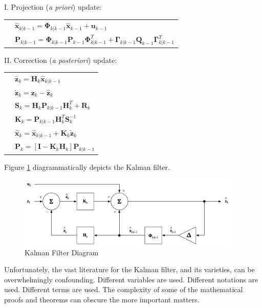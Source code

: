 I. Projection (\textit{a priori}) update:

\begingroup
\renewcommand{\arraystretch}{1.25}
\begin{tabular}{l l}
\phantom{.} & $\hat{\mathbf{x}}_{k|k-1} = \mathbf{\Phi}_{k|k-1} \hat{\mathbf{x}}_{k-1} + \mathbf{u}_{k-1}$ \\
\phantom{.} & $\mathbf{P}_{k|k-1} = \mathbf{\Phi}_{k|k-1} \mathbf{P}_{k-1} \mathbf{\Phi}_{k|k-1}^T + \mathbf{\Gamma}_{k|k-1} \mathbf{Q}_{k-1} \mathbf{\Gamma}_{k|k-1}^T$
\end{tabular}
\endgroup

II. Correction (\textit{a posteriori}) update:

\begingroup
\renewcommand{\arraystretch}{1.25}
\begin{tabular}{l l}
\phantom{.} & $\hat{\mathbf{z}}_k = \mathbf{H}_k \hat{\mathbf{x}}_{k|k-1}$ \\
\phantom{.} & $\tilde{\mathbf{z}}_k = \mathbf{z}_k - \hat{\mathbf{z}}_k$ \\
\phantom{.} & $\mathbf{S}_k = \mathbf{H}_k \mathbf{P}_{k|k-1} \mathbf{H}_k^T + \mathbf{R}_k$ \\
\phantom{.} & $\mathbf{K}_k = \mathbf{P}_{k|k-1} \mathbf{H}_{k}^T \mathbf{S}_k^{-1}$ \\
\phantom{.} & $\hat{\mathbf{x}}_k = \hat{\mathbf{x}}_{k|k-1} +\mathbf{K}_k \tilde{\mathbf{z}}_k$ \\
\phantom{.} & $\mathbf{P}_k = \left[ \mathbf{I} - \mathbf{K}_k \mathbf{H}_k \right] \mathbf{P}_{k|k-1}$
\end{tabular}
\endgroup

Figure \ref{fig:kf-diagram} diagrammatically depicts the Kalman filter.

\begin{figure}[ht]
    \centering
    \includegraphics[width=0.95\textwidth]{images/KF-Diagram.png}
    \caption{Kalman Filter Diagram}
    \label{fig:kf-diagram}
\end{figure}

Unfortunately, the vast literature for the Kalman filter, and its varieties, can be
overwhelmingly confounding. Different variables are used. Different notations are used.
Different terms are used. The complexity of some of the mathematical proofs and theorems
can obscure the more important matters.

